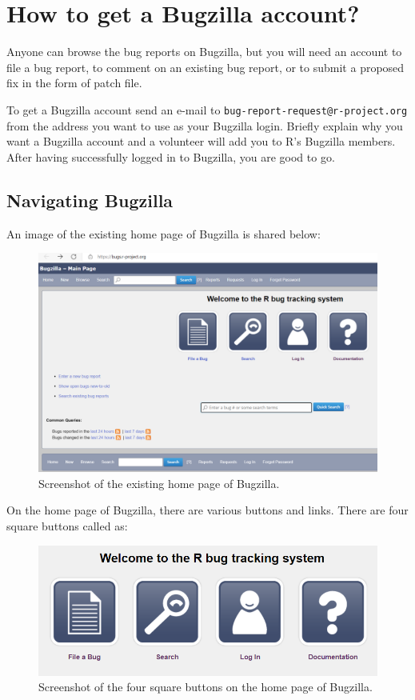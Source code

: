 \documentclass[
]{book}
\begin{document}
\section{How to get a Bugzilla account?}\label{bugzilla-account}

Anyone can browse the bug reports on Bugzilla, but you will need an account to file a bug report, to comment on an existing bug report, or to submit a proposed fix in the form of patch file.

To get a Bugzilla account send an e-mail to \texttt{bug-report-request@r-project.org} from the address you want to use as your Bugzilla login. Briefly explain why you want a Bugzilla account and a volunteer will add you to R's Bugzilla members. After having successfully logged in to Bugzilla, you are good to go.

\subsection{Navigating Bugzilla}\label{Bugzilla}

An image of the existing home page of Bugzilla is shared below:

\begin{figure}
\centering
\includegraphics{img/bugzilla.png}
\caption{Screenshot of the existing home page of Bugzilla.}
\end{figure}

On the home page of Bugzilla, there are various buttons and links. There are four square buttons called as:

\begin{figure}
\centering
\includegraphics{img/squarebuttons.png}
\caption{Screenshot of the four square buttons on the home page of Bugzilla.}
\end{figure}
\end{document}
